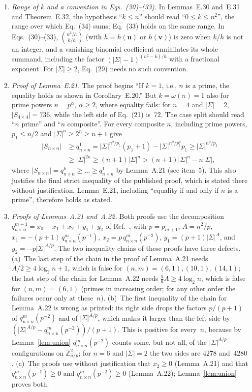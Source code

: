 \documentclass[10pt,twocolumn,letterpaper]{article}
\newcommand{\onlinecite}[1]{\citen{#1}}
\newcommand{\ZZ}{\mathbb{Z}}
\newcommand{\sig}{|\Sigma|}
\newcommand{\vv}{\mathbf v}
\begin{document}
\begin{enumerate}[leftmargin=*,label=\arabic*.,itemsep=0.5ex]
\item \emph{Range of $k$ and a convention in Eqs.~(30)--(33).} In
Lemmas~E.30 and~E.31 and Theorem~E.32, the hypothesis ``$k\le n$'' should
read ``$0\le k\le n^2$'', the range over which Eq.~(34) sums; Eq.~(33)
holds on the same range. In Eqs.~(30)--(33), $\binom{n^2/h}{k/h}$ (with
$h=h(\mathbf u)$ or $h(\vv)$) is zero when $k/h$ is not an integer, and a
vanishing binomial coefficient annihilates its whole summand, including the
factor $(\sig-1)^{(n^2-k)/h}$ with a fractional exponent. For $\sig\ge2$,
Eq.~(29) needs no such convention.

\item \emph{Proof of Lemma~E.21.} The proof begins ``If $k=1$, i.e., $n$
is a prime, the equality holds as shown in Corollary~E.20.'' But $k=\omega(n)=1$ also for prime powers
$n=p^\alpha$, $\alpha\ge2$, where equality fails: for $n=4$ and $\sig=2$,
$|S_{4\times4}|=736$, while the left side of Eq.~(21) is~$72$. The case
split should read ``$n$ prime'' and ``$n$ composite''. For every composite
$n$, including prime powers, $p_1\le n/2$ and $\sig^n\ge2^n\ge n+1$ give
\begin{align*}
  |S_{n\times n}|&\ge q^1_{n\times n}
  =\sig^{n^2/p_1}(p_1{+}1)-\sig^{n^2/p_1^2}p_1\ge\sig^{n^2/p_1}\\
  &\ge\sig^{2n}\ge(n{+}1)\sig^n>(n{+}1)\sig^n-n\sig,
\end{align*}
where $|S_{n\times n}|=q^k_{n\times n}\ge\dots\ge q^1_{n\times n}$ by
Lemma~A.21 (see item~5). This also justifies the final strict inequality of
the published proof, which is stated there without justification. Lemma~E.21,
including ``equality if and only if $n$ is a prime'', therefore holds as
stated.

\item \emph{Proofs of Lemmas~A.21 and~A.22.} Both proofs use the
decomposition $q^{m+1}_{n\times n}=x_0+x_1+x_2+y_1+y_2$ of
Ref.~\onlinecite{banda2019}, with $p=p_{m+1}$, $A=n^2/p$,
$x_1=-(p{+}1)\,q^m_{n\times n}(p^{-1})$, $x_2=p\,q^m_{n\times n}(p^{-2})$,
$y_1=(p{+}1)\sig^{A}$, and $y_2=-p\sig^{A/p}$. The two inequality chains
of these proofs have three defects.
(a)~The last step of the chain in the proof of Lemma~A.21 needs
$A/2\ge4\log_2 n+1$, which is false for $(n,m)=(6,1),(10,1),(14,1)$; the
last step of the chain for Lemma~A.22 needs $\tfrac56A\ge4\log_2n$, which
is false for $(n,m)=(6,1)$ (primes in increasing order; for any other order
the failures occur only at these~$n$). (b)~The first inequality of the
chain for Lemma~A.22 is wrong as printed: its right side drops the factors
$p/(p{+}1)$ of $q^m_{n\times n}(p^{-2})$ and of $\sig^{A/p}$, which makes it
larger than the left side by
$(\sig^{A/p}-q^m_{n\times n}(p^{-2}))/(p{+}1)$. This is positive for
every~$n$, because by Lemma~\ref{lem:union} $q^m_{n\times n}(p^{-2})$ counts
some, but not all, of the $\sig^{A/p}$ configurations on $\ZZ_{n/p}^2$; for
$n=6$ and $\sig=2$ the two sides are $4278$ and~$4280$. (c)~The proofs use
without justification that $x_2\ge0$ (Lemma~A.21) and that
$q^m_{n\times n}(p^{-1})\ge0$ and $q^m_{n\times n}(p^{-2})\ge0$
(Lemma~A.22); Lemma~\ref{lem:union} proves both.


\end{enumerate}
\end{document}
